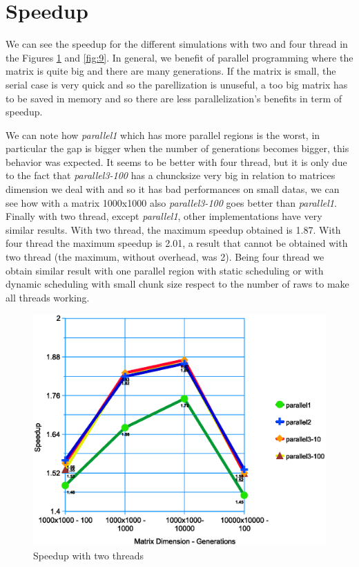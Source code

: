 \documentclass[a4paper,11pt,twoside]{report}
\begin{document}
\section{Speedup}

We can see the speedup for the different simulations with two and four thread in the Figures \ref{fig:8} and \ref{fig:9}. In general, we benefit of parallel programming where the matrix is quite big and there are many generations. If the matrix is small, the serial case is very quick and so the parellization is unuseful, a too big matrix has to be saved in memory and so there are less parallelization's benefits in term of speedup. 

\noindent We can note how \emph{parallel1} which has more parallel regions is the worst, in particular the gap is bigger when the number of generations becomes bigger, this behavior was expected. It seems to be better with four thread, but it is only due to the fact that \emph{parallel3-100} has a chuncksize very big in relation to matrices dimension we deal with and so it has bad performances on small datas, we can see how with a matrix 1000x1000 also \emph{parallel3-100}
goes better than \emph{parallel1}. Finally with two thread, except \emph{parallel1}, other implementations have very similar results. With two thread, the maximum speedup obtained is 1.87.
With four thread the maximum speedup is 2.01, a result that cannot be obtained with two thread (the maximum, without overhead, was 2). Being four thread we obtain similar result with one parallel region with static scheduling or with dynamic scheduling with small chunk size respect to the number of raws to make all threads working. 
\begin{center}
\begin{figure}
	\centering
	\includegraphics[scale = 0.5]{2.eps}
	\caption{Speedup with two threads} \label{fig:8}
\end{figure}
\end{center}
\end{document}
